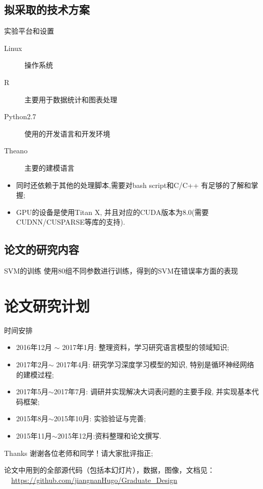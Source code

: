 \documentclass[14pt]{Bredelebeamer}
\begin{document}
\subsection{拟采取的技术方案}
\begin{frame}{实验平台和设置}
	\begin{description}
		\item[Linux] 操作系统
		\item[R] 主要用于数据统计和图表处理
		\item[Python2.7] 使用的开发语言和开发环境
		\item[Theano] 主要的建模语言
	\end{description}
  \pause
	\begin{block}{}
		\begin{itemize}
			\item 同时还依赖于其他的处理脚本,需要对bash script和C/C++ 有足够的了解和掌握;
			\item GPU的设备是使用Titan X, 并且对应的CUDA版本为8.0(需要CUDNN/CUSPARSE等库的支持).
		\end{itemize}
	\end{block}
\end{frame}

\subsection{论文的研究内容}
\begin{frame}{SVM的训练}
	使用80组不同参数进行训练，得到的SVM在错误率方面的表现
\end{frame}

\section{论文研究计划}
\begin{frame}{时间安排}
	\begin{block}{}
\begin{itemize}
  \item 2016年12月 $\sim$ 2017年1月: 整理资料，学习研究语言模型的领域知识;
  \item 2017年2月$\sim$ 2017年4月: 研究学习深度学习模型的知识, 特别是循环神经网络的建模过程;
  \item 2017年5月$\sim$2017年7月: 调研并实现解决大词表问题的主要手段, 并实现基本代码框架;
  \item 2015年8月$\sim$2015年10月: 实验验证与完善;
  \item 2015年11月$\sim$2015年12月:资料整理和论文撰写.
\end{itemize}
    \end{block}
\end{frame}

\begin{frame}{Thanks}
	\centering
    谢谢各位老师和同学！请大家批评指正;

	论文中用到的全部源代码（包括本幻灯片），数据，图像，文档见：
	 {\faGithub~~\url{https://github.com/jiangnanHugo/Graduate_Design}}
\end{frame}
\end{document}
